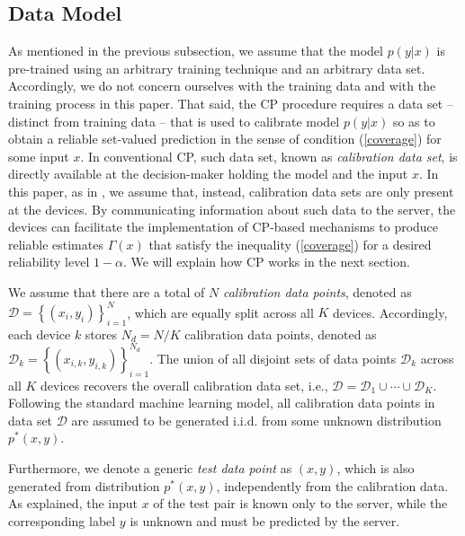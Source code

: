 \documentclass[12pt, draftclsnofoot, onecolumn]{IEEEtran}
\begin{document}
\subsection{Data Model}
As mentioned in the previous subsection, we assume that the model $p(y|x)$ is pre-trained using an arbitrary training technique and an arbitrary data set. Accordingly, we do not concern ourselves with the training data and with the training process in this paper. That said, the CP procedure requires a data set -- distinct from training data -- that is used to calibrate model $p(y|x)$ so as to obtain a reliable set-valued prediction in the sense of condition (\ref{coverage}) for some input $x$. In conventional CP, such data set, known as \emph{calibration data set}, is directly available at the decision-maker holding the model and the input $x$. In this paper, as in \cite{FedCP-QQ}, we assume that, instead, calibration data sets are only present at the devices. By communicating information about such data to the server, the devices can facilitate the implementation of CP-based mechanisms to produce reliable estimates $\Gamma(x)$ that satisfy the inequality (\ref{coverage}) for a desired reliability level $1-\alpha$. We will explain how CP works in the next section.

We assume that there are a total of $N$ \emph{calibration data points}, denoted as $\mathcal{D}=\left\{(x_i,y_i)\right\}_{i=1}^N$, which are equally split across all $K$ devices. Accordingly, each device $k$ stores $N_d=N/K$ calibration data points, denoted as $\mathcal{D}_k = \left\{(x_{i,k}, y_{i,k})\right\}_{i=1}^{N_d}$. The union of all disjoint sets of data points $\mathcal{D}_k$ across all $K$ devices recovers the overall calibration data set, i.e., $\mathcal{D} =\mathcal{D}_1\cup\cdots\cup\mathcal{D}_K $. Following the standard machine learning model, all calibration data points in data set $\mathcal{D}$ are assumed to be generated i.i.d. from some unknown distribution $p^*(x,y)$.


Furthermore, we denote a generic \emph{test data point} as $(x, y)$, which is also generated from distribution $p^*(x,y)$, independently from the calibration data. As explained, the input $x$ of the test pair is known only to the server, while the corresponding label $y$ is unknown and must be predicted by the server.
\end{document}
